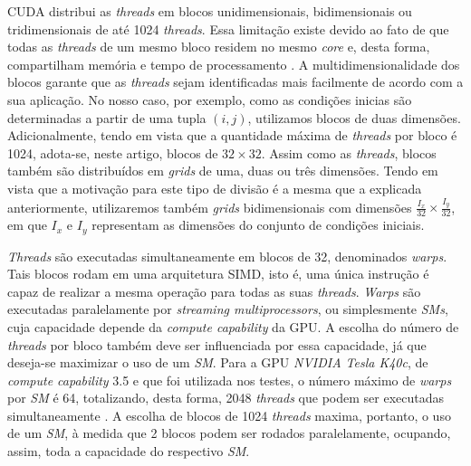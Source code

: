 \documentclass[12pt]{article}
\begin{document}
CUDA distribui as \textit{threads} em blocos unidimensionais, bidimensionais ou
tridimensionais de até 1024 \textit{threads}. Essa limitação existe devido ao
fato de que todas as \textit{threads} de um mesmo bloco residem no mesmo
\textit{core} e, desta forma, compartilham memória e tempo de processamento
\cite{cuda}. A multidimensionalidade dos blocos garante que as \textit{threads}
sejam identificadas mais facilmente de acordo com a sua aplicação. No nosso
caso, por exemplo, como as condições inicias são determinadas a partir de uma
tupla \((i,j)\), utilizamos blocos de duas dimensões. Adicionalmente, tendo em
vista que a quantidade máxima de \textit{threads} por bloco é 1024, adota-se,
neste artigo, blocos de \(32\times32\). Assim como as \textit{threads}, blocos
também são distribuídos em \textit{grids} de uma, duas ou três dimensões. Tendo
em vista que a motivação para este tipo de divisão é a mesma que a explicada
anteriormente, utilizaremos também \textit{grids} bidimensionais com dimensões
\(\frac{I_x}{32}\times\frac{I_y}{32}\), em que \(I_x\) e \(I_y\) representam as
dimensões do conjunto de condições iniciais.

\textit{Threads} são executadas simultaneamente em blocos de 32, denominados
\textit{warps}. Tais blocos rodam em uma arquitetura SIMD, isto é, uma única
instrução é capaz de realizar a mesma operação para todas as suas
\textit{threads}. \textit{Warps} são executadas paralelamente por
\textit{streaming multiprocessors}, ou simplesmente \textit{SMs}, cuja
capacidade depende da \textit{compute capability} da GPU. A escolha do número de
\textit{threads} por bloco também deve ser influenciada por essa capacidade, já
que deseja-se maximizar o uso de um \textit{SM}. Para a GPU \textit{NVIDIA Tesla
K40c}, de \textit{compute capability} 3.5 e que foi utilizada nos testes, o
número máximo de \textit{warps} por \textit{SM} é 64, totalizando, desta forma,
2048 \textit{threads} que podem ser executadas simultaneamente \cite{compute}. A
escolha de blocos de 1024 \textit{threads} maxima, portanto, o uso de um
\textit{SM}, à medida que 2 blocos podem ser rodados paralelamente, ocupando,
assim, toda a capacidade do respectivo \textit{SM}.
\end{document}
